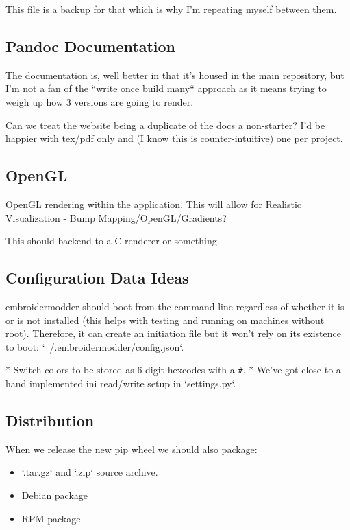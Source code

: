 \documentclass[10pt]{report}
\begin{document}
This file is a backup for that which is why I'm repeating myself between them.

\subsection{Pandoc Documentation}

The documentation is, well better in that it's housed in the main repository,
but I'm not a fan of the ``write once build many`` approach as it means
trying to weigh up how 3 versions are going to render.

Can we treat the website being a duplicate of the docs a non-starter?
I'd be happier with tex/pdf only and (I know this is counter-intuitive) one
per project.

\subsection{OpenGL}

OpenGL rendering within the application. This will allow for
Realistic Visualization - Bump Mapping/OpenGL/Gradients?

This should backend to a C renderer or something.

\subsection{Configuration Data Ideas}

embroidermodder should boot from the command line
regardless of whether it is or is not installed (this helps with testing and
running on machines without root). Therefore, it can create an initiation file
but it won't rely on its existence to boot: `~/.embroidermodder/config.json`.

* Switch colors to be stored as 6 digit hexcodes with a \texttt{\#}.
* We've got close to a hand implemented ini read/write setup in `settings.py`.

\subsection{Distribution}

When we release the new pip wheel we should also package:

\begin{itemize}
\item `.tar.gz` and `.zip` source archive.
\item Debian package
\item RPM package
\end{itemize}
\end{document}

